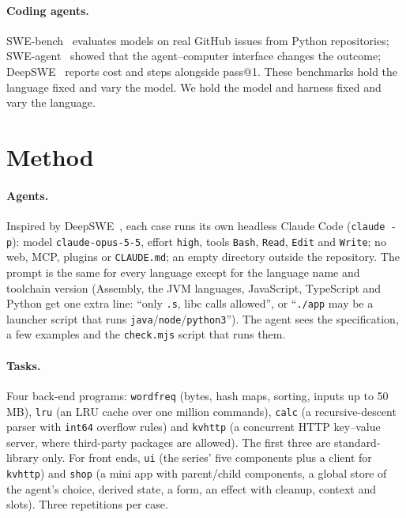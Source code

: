 \documentclass[11pt,a4paper]{article}
\begin{document}
\paragraph{Coding agents.} SWE-bench~\cite{swebench} evaluates models on real GitHub issues from
Python repositories; SWE-agent~\cite{sweagent} showed that the agent--computer interface changes the
outcome; DeepSWE~\cite{deepswe} reports cost and steps alongside pass@1. These benchmarks hold the
language fixed and vary the model. We hold the model and harness fixed and vary the language.

\section{Method}

\paragraph{Agents.} Inspired by DeepSWE~\cite{deepswe}, each case runs its own headless Claude Code
(\texttt{claude -p}): model \texttt{claude-opus-5-5}, effort \texttt{high}, tools \texttt{Bash},
\texttt{Read}, \texttt{Edit} and \texttt{Write}; no web, MCP, plugins or \texttt{CLAUDE.md}; an empty
directory outside the repository. The prompt is the same for every language except for the language name
and toolchain version (Assembly, the JVM languages, JavaScript, TypeScript and Python get one extra line: ``only
\texttt{.s}, libc calls allowed'', or ``\texttt{./app} may be a launcher script that runs
\texttt{java}/\texttt{node}/\texttt{python3}''). The agent sees the
specification, a few examples and the \texttt{check.mjs} script that runs them.

\paragraph{Tasks.} Four back-end programs: \texttt{wordfreq} (bytes, hash maps, sorting, inputs up to
50\,MB), \texttt{lru} (an LRU cache over one million commands), \texttt{calc} (a recursive-descent
parser with \texttt{int64} overflow rules) and \texttt{kvhttp} (a concurrent HTTP key--value server,
where third-party packages are allowed). The first three are standard-library only. For front ends,
\texttt{ui} (the series' five components plus a client for \texttt{kvhttp}) and \texttt{shop} (a mini
app with parent/child components, a global store of the agent's choice, derived state, a form, an effect
with cleanup, context and slots). Three repetitions per case.
\end{document}
